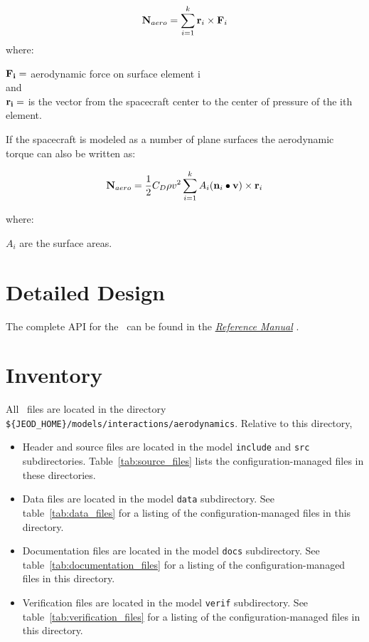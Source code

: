 \begin{equation}
{\bf{N}}_{aero}  = \sum\limits_{i = 1}^k {{\bf{r}}_i  \times {\bf{F}}_i }
\end{equation}
where:

$\bf{F}_{i} =$ aerodynamic force on surface element i \\
and \\
$\bf{r}_{i} =$ is the vector from the spacecraft center to the center of pressure of the ith element.

If the spacecraft is modeled as a number of plane surfaces the aerodynamic
torque can also be written as:

\begin{equation}
{\bf{N}}_{aero}  = \frac{1}{2}C_D \rho v^2 \sum\limits_{i = 1}^k {A_i } ({\bf{n}}_i  \bullet {\bf{v}}) \times {\bf{r}}_i
\label{eqn:spec:6}
\end{equation}

where:

$A_{i}$ are the surface areas.


\section{Detailed Design}

The complete API for the \aerodynamicsDesc\ can be found
in the  \href{file:refman.pdf} {\em Reference Manual}
\cite{aerodynamicsbib:ReferenceManual}.

\section{Inventory}
All \aerodynamicsDesc\ files are located in the directory \newline
{\tt \$\{JEOD\_HOME\}/models/interactions/aerodynamics}.
Relative to this directory,
\begin{itemize}
\vspace{-0.2\baselineskip}
\item Header and source files are located
in the model {\tt include} and {\tt src} subdirectories.
Table~\ref{tab:source_files} lists the
configuration-managed files in these directories.
\vspace{-0.1\baselineskip}
\item Data files are located in the model {\tt data} subdirectory.
See table~\ref{tab:data_files}
for a listing of the
configuration-managed files in this directory.
\vspace{-0.1\baselineskip}
\item Documentation files are located in the model {\tt docs} subdirectory.
See table~\ref{tab:documentation_files}
for a listing of the
configuration-managed files in this directory.
\vspace{-0.1\baselineskip}
\item Verification files are located in the model {\tt verif} subdirectory.
See table~\ref{tab:verification_files}
for a listing of the
configuration-managed files in this directory.
\end{itemize}

